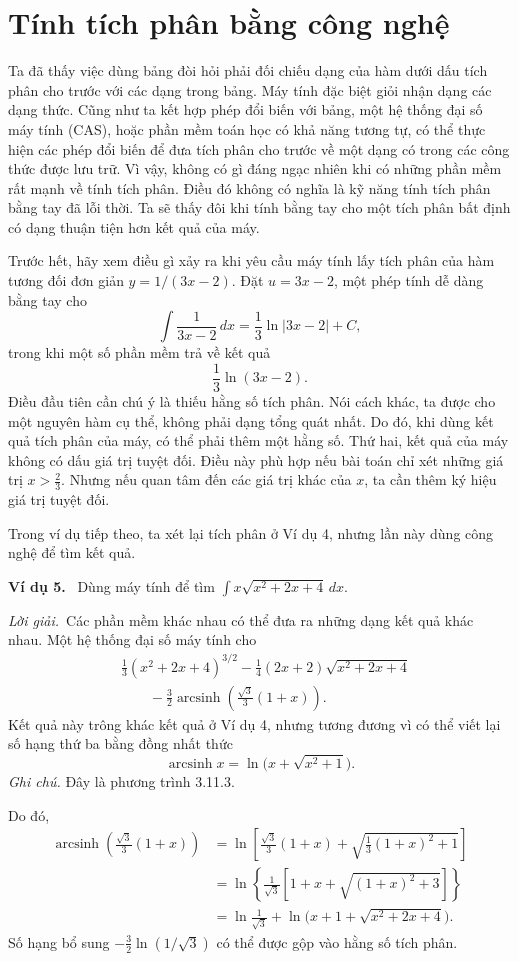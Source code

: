 \documentclass[12pt,a4paper]{article}
\newcommand{\ex}[1]{\par\medskip\noindent\textbf{Ví dụ #1.}\ }
\newcommand{\sol}{\par\nopagebreak[4]\noindent\textit{Lời giải.}\ }
\begin{document}
\section*{Tính tích phân bằng công nghệ}
Ta đã thấy việc dùng bảng đòi hỏi phải đối chiếu dạng của hàm dưới dấu tích phân cho trước với các dạng trong bảng. Máy tính đặc biệt giỏi nhận dạng các dạng thức. Cũng như ta kết hợp phép đổi biến với bảng, một hệ thống đại số máy tính (CAS), hoặc phần mềm toán học có khả năng tương tự, có thể thực hiện các phép đổi biến để đưa tích phân cho trước về một dạng có trong các công thức được lưu trữ. Vì vậy, không có gì đáng ngạc nhiên khi có những phần mềm rất mạnh về tính tích phân. Điều đó không có nghĩa là kỹ năng tính tích phân bằng tay đã lỗi thời. Ta sẽ thấy đôi khi tính bằng tay cho một tích phân bất định có dạng thuận tiện hơn kết quả của máy.

Trước hết, hãy xem điều gì xảy ra khi yêu cầu máy tính lấy tích phân của hàm tương đối đơn giản $y=1/(3x-2)$. Đặt $u=3x-2$, một phép tính dễ dàng bằng tay cho
\[\int\frac1{3x-2}\,dx=\frac13\ln|3x-2|+C,\]
trong khi một số phần mềm trả về kết quả
\[\frac13\ln(3x-2).\]
Điều đầu tiên cần chú ý là thiếu hằng số tích phân. Nói cách khác, ta được cho một nguyên hàm cụ thể, không phải dạng tổng quát nhất. Do đó, khi dùng kết quả tích phân của máy, có thể phải thêm một hằng số. Thứ hai, kết quả của máy không có dấu giá trị tuyệt đối. Điều này phù hợp nếu bài toán chỉ xét những giá trị $x>\tfrac23$. Nhưng nếu quan tâm đến các giá trị khác của $x$, ta cần thêm ký hiệu giá trị tuyệt đối.

Trong ví dụ tiếp theo, ta xét lại tích phân ở Ví dụ 4, nhưng lần này dùng công nghệ để tìm kết quả.

\ex{5} Dùng máy tính để tìm $\displaystyle\int x\sqrt{x^2+2x+4}\,dx$.
\sol Các phần mềm khác nhau có thể đưa ra những dạng kết quả khác nhau. Một hệ thống đại số máy tính cho
\begin{align*}
&\frac13(x^2+2x+4)^{3/2}-\frac14(2x+2)\sqrt{x^2+2x+4}\\
&\qquad-\frac32\operatorname{arcsinh}\left(\frac{\sqrt3}{3}(1+x)\right).
\end{align*}
Kết quả này trông khác kết quả ở Ví dụ 4, nhưng tương đương vì có thể viết lại số hạng thứ ba bằng đồng nhất thức
\[\operatorname{arcsinh}x=\ln\bigl(x+\sqrt{x^2+1}\bigr).\]
\textit{Ghi chú.} Đây là phương trình 3.11.3.

Do đó,
\begin{align*}
\operatorname{arcsinh}\left(\frac{\sqrt3}{3}(1+x)\right)
&=\ln\left[\frac{\sqrt3}{3}(1+x)+\sqrt{\frac13(1+x)^2+1}\right]\\
&=\ln\left\{\frac1{\sqrt3}\left[1+x+\sqrt{(1+x)^2+3}\right]\right\}\\
&=\ln\frac1{\sqrt3}+\ln\bigl(x+1+\sqrt{x^2+2x+4}\bigr).
\end{align*}
Số hạng bổ sung $-\tfrac32\ln(1/\sqrt3)$ có thể được gộp vào hằng số tích phân.
\end{document}

